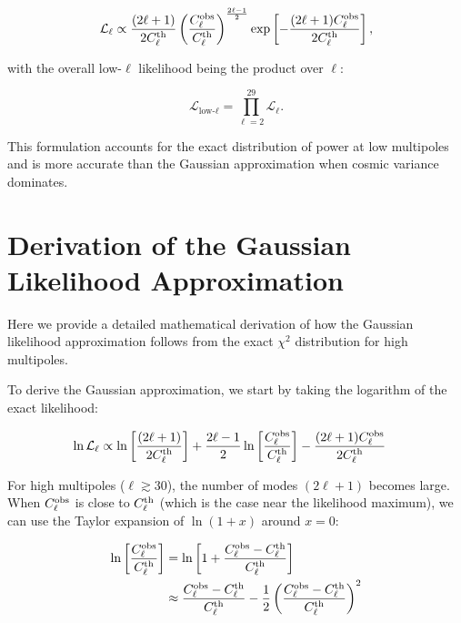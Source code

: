 \documentclass[11pt]{article}
\theoremstyle{definition}
\begin{document}
\begin{equation}
  \mathcal{L}_\ell \propto \frac{(2\ell+1)}{2C_\ell^{\rm th}} 
  \left(\frac{C_\ell^{\rm obs}}{C_\ell^{\rm th}}\right)^{\frac{2\ell-1}{2}} 
  \exp\left[-\frac{(2\ell+1)C_\ell^{\rm obs}}{2C_\ell^{\rm th}}\right],
\end{equation}

with the overall low-$\ell$ likelihood being the product over $\ell$:

\begin{equation}
  \mathcal{L}_{\text{low-}\ell} = \prod_{\ell=2}^{29} \mathcal{L}_\ell.
\end{equation}

This formulation accounts for the exact distribution of power at low multipoles and is more accurate than the Gaussian approximation when cosmic variance dominates.

\renewcommand{\thesection}{B}
\section{Derivation of the Gaussian Likelihood Approximation}

Here we provide a detailed mathematical derivation of how the Gaussian likelihood approximation follows from the exact $\chi^2$ distribution for high multipoles.

To derive the Gaussian approximation, we start by taking the logarithm of the exact likelihood:

\begin{align}
\ln\mathcal{L}_\ell &\propto \ln\left[\frac{(2\ell+1)}{2C_\ell^{\rm th}}\right] + \frac{2\ell-1}{2}\ln\left[\frac{C_\ell^{\rm obs}}{C_\ell^{\rm th}}\right] - \frac{(2\ell+1)C_\ell^{\rm obs}}{2C_\ell^{\rm th}}
\end{align}

For high multipoles ($\ell \gtrsim 30$), the number of modes $(2\ell+1)$ becomes large. When $C_\ell^{\rm obs}$ is close to $C_\ell^{\rm th}$ (which is the case near the likelihood maximum), we can use the Taylor expansion of $\ln(1+x)$ around $x=0$:

\begin{align}
\ln\left[\frac{C_\ell^{\rm obs}}{C_\ell^{\rm th}}\right] &= \ln\left[1 + \frac{C_\ell^{\rm obs} - C_\ell^{\rm th}}{C_\ell^{\rm th}}\right] \\
&\approx \frac{C_\ell^{\rm obs} - C_\ell^{\rm th}}{C_\ell^{\rm th}} - \frac{1}{2}\left(\frac{C_\ell^{\rm obs} - C_\ell^{\rm th}}{C_\ell^{\rm th}}\right)^2
\end{align}
\end{document}

